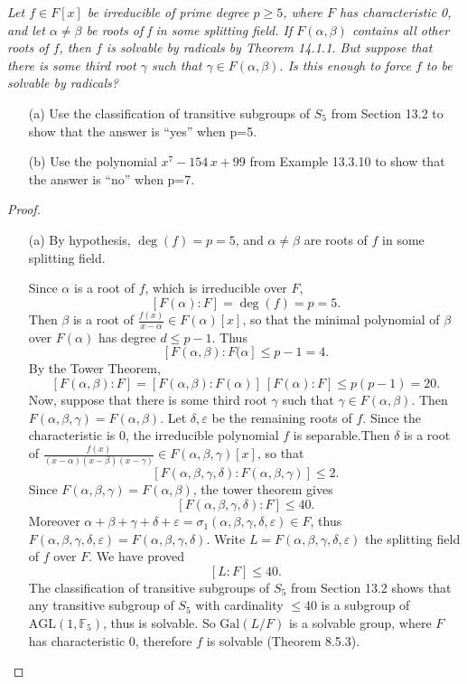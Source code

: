 \documentclass[11pt,a4paper]{article}
\newcommand{\F}{\mathbb{F}}
\newcommand{\Gal}{\mathrm{Gal}}
\begin{document}
{\it Let $f\in F[x]$ be irreducible of prime degree $p\geq 5$, where $F$ has characteristic 0, and let $\alpha\ne\beta$ be roots of f in some splitting field. If $F(\alpha,\beta)$ contains all other roots of $f$, then $f$ is solvable by radicals by Theorem 14.1.1. But suppose that there is some third root $\gamma$ such that $\gamma\in F(\alpha,\beta)$. Is this enough to force $f$ to be solvable by radicals?
\begin{enumerate}
\item[(a)] Use the classification of transitive subgroups of $S_5$ from Section 13.2 to show that the answer is ``yes'' when p=5.
\item[(b)] Use the polynomial $x^7-154\,x+99$ from Example 13.3.10 to show that the answer is ``no'' when p=7.
\end{enumerate}
}
\begin{proof}
\begin{enumerate}
\item[(a)]   
By hypothesis, $\deg(f) = p = 5$, and $\alpha \ne \beta$ are roots of $f$ in some splitting field.

Since $\alpha$ is a root of $f$, which is irreducible over $F$,
$$[F(\alpha) : F] = \deg(f) = p = 5.$$
Then $\beta$ is a root of $\frac{f(x)}{x-\alpha} \in F(\alpha)[x]$, so that the minimal polynomial of $\beta$ over $F(\alpha)$ has degree $d\leq p-1$. Thus
$$[F(\alpha,\beta) : F(\alpha] \leq p-1 = 4.$$
By the Tower Theorem,
$$[F(\alpha,\beta):F]  =   [F(\alpha,\beta):F(\alpha)] \ [F(\alpha):F] \leq p(p-1) = 20.$$
Now, suppose that there is some third root $\gamma$ such that $\gamma\in F(\alpha,\beta)$. Then $F(\alpha,\beta,\gamma) = F(\alpha,\beta)$. Let $\delta, \varepsilon$ be the remaining roots of $f$. Since the characteristic is $0$, the irreducible polynomial $f$ is separable.Then $\delta$ is a root of $\frac{f(x)}{(x-\alpha)(x-\beta)(x-\gamma)} \in F(\alpha,\beta,\gamma)[x]$, so that
$$[F(\alpha,\beta,\gamma,\delta):F(\alpha,\beta,\gamma)] \leq 2.$$
Since $F(\alpha,\beta,\gamma) = F(\alpha,\beta)$, the tower theorem gives
$$[F(\alpha,\beta,\gamma, \delta):F] \leq 40.$$
Moreover $\alpha + \beta +\gamma + \delta + \varepsilon = \sigma_1(\alpha,\beta,\gamma, \delta,\varepsilon) \in F$, thus $F(\alpha,\beta,\gamma, \delta,\varepsilon) = F(\alpha,\beta,\gamma, \delta)$. Write $L = F(\alpha,\beta,\gamma, \delta,\varepsilon)$ the splitting field of $f$ over $F$. We have proved
$$[L:F]\leq 40.$$
The classification of transitive subgroups of $S_5$ from Section 13.2 shows that any transitive subgroup of $S_5$ with cardinality $\le 40$ is a subgroup of $\mathrm{AGL}(1,\F_5)$, thus is solvable. So $\Gal(L/F)$ is a solvable group, where $F$ has characteristic $0$, therefore $f$ is solvable (Theorem 8.5.3).


\end{enumerate}
\end{proof}
\end{document}
